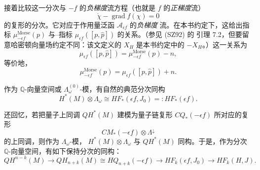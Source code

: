 接着比较这一分次与 $-f$ 的\emph{负梯度}流方程（也就是 $f$ 的\emph{正梯度}流）
\[
 \dot\chi-\operatorname{grad}f(\chi)=0
\]
的\personMorse{}复形的\personMorse{}分次。它对应于作用量泛函 $\mathcal A_{\epsilon f}$ 的\emph{负梯度}
流。在本书约定下，这给出\personMorse{}指标 $\mu_{-\epsilon f}^{\mathrm{Morse}}(p)$ 与\personConley{}--\personZehnder{}指标 $\mu_{\epsilon f}([p,\widehat p])$ 的关系。（参见 (SZ92) 的
引理 7.2，但要留意哈密顿向量场约定不同：该文定义的 $X_H$ 是本书约定中的
$-X_H$。）这一关系为
\[
 \mu_{\epsilon f}([p,\widehat p])
 =\mu_{-\epsilon f}^{\mathrm{Morse}}(p)-n,
\]
等价地，
\[
 \mu_{-\epsilon f}^{\mathrm{Morse}}(p)
 =\mu_{\epsilon f}([p,\widehat p])+n.
\]

\begin{corollary}
\label{cor:small-hamiltonian-floer-cohomology}
作为 $\mathbb Q$-向量空间或 $\Lambda_\omega^{(0)}$-模，有自然的典范分次同构
\[
 H^*(M)\otimes\Lambda_\omega
 \cong HF_*(\epsilon f,J_0)=:HF_*(\epsilon f).
\]
\end{corollary}

还回忆，若把量子上同调 $QH^*(M)$ 建模为量子链复形 $CQ_*(-\epsilon f)$ 所对应的\personMorse{}复形
\[
 CM_*(-\epsilon f)\otimes\Lambda^\downarrow
\]
的上同调，则作为 $\Lambda_\omega$-模，
$H^*(M)\otimes\Lambda_\omega$ 与 $QH^*(M)$ 同构。于是，作为分次
$\mathbb Q$-向量空间，有如下保持分次的同构：
\[
 QH^{n-k}(M)\longrightarrow QH_{n+k}(M)
 \cong HQ_{n+k}(-\epsilon f)\longrightarrow HF_k(\epsilon f,J_0)
 \longrightarrow HF_k(H,J).
\]
